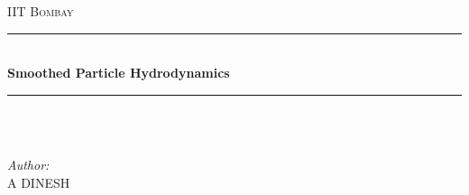 \documentclass[12pt]{article}
\begin{document}
\begin{titlepage}

\newcommand{\HRule}{\rule{\linewidth}{0.5mm}} %

\center %
 

\textsc{\LARGE IIT Bombay}\\[1.5cm] %


\HRule \\[0.4cm]
{ \huge \bfseries Smoothed Particle Hydrodynamics}\\[0.4cm] %
\HRule \\[1.5cm]
 

~

\Large \emph{Author:}\\
A \textsc{DINESH}\\[3cm] %


\end{titlepage}
\end{document}
